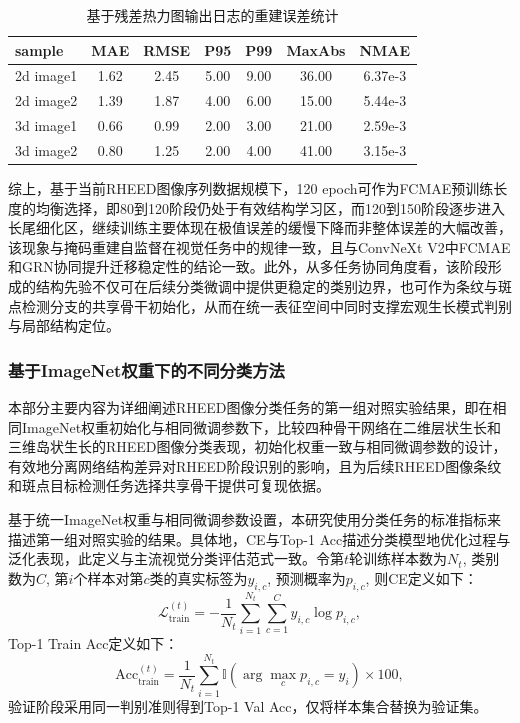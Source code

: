 \begin{table}[H]
    \centering
    \caption{基于残差热力图输出日志的重建误差统计}
    \label{tab:cp2_fcmae_residual_metrics}
    \small
    \begin{tabular}{lcccccc}
        \toprule
        sample    & MAE  & RMSE & P95  & P99  & MaxAbs & NMAE    \\
        \midrule
        2d image1 & 1.62 & 2.45 & 5.00 & 9.00 & 36.00  & 6.37e-3 \\
        2d image2 & 1.39 & 1.87 & 4.00 & 6.00 & 15.00  & 5.44e-3 \\
        3d image1 & 0.66 & 0.99 & 2.00 & 3.00 & 21.00  & 2.59e-3 \\
        3d image2 & 0.80 & 1.25 & 2.00 & 4.00 & 41.00  & 3.15e-3 \\
        \bottomrule
    \end{tabular}
\end{table}


综上，基于当前RHEED图像序列数据规模下，120 epoch可作为FCMAE预训练长度的均衡选择，即80到120阶段仍处于有效结构学习区，而120到150阶段逐步进入长尾细化区，继续训练主要体现在极值误差的缓慢下降而非整体误差的大幅改善，该现象与掩码重建自监督在视觉任务中的规律一致，且与ConvNeXt V2中FCMAE和GRN协同提升迁移稳定性的结论一致。此外，从多任务协同角度看，该阶段形成的结构先验不仅可在后续分类微调中提供更稳定的类别边界，也可作为条纹与斑点检测分支的共享骨干初始化，从而在统一表征空间中同时支撑宏观生长模式判别与局部结构定位。


\subsubsection{基于ImageNet权重下的不同分类方法}
本部分主要内容为详细阐述RHEED图像分类任务的第一组对照实验结果，即在相同ImageNet权重初始化与相同微调参数下，比较四种骨干网络在二维层状生长和三维岛状生长的RHEED图像分类表现，初始化权重一致与相同微调参数的设计，有效地分离网络结构差异对RHEED阶段识别的影响，且为后续RHEED图像条纹和斑点目标检测任务选择共享骨干提供可复现依据。

基于统一ImageNet权重与相同微调参数设置，本研究使用分类任务的标准指标来描述第一组对照实验的结果。具体地，CE与Top-1 Acc描述分类模型地优化过程与泛化表现，此定义与主流视觉分类评估范式一致。令第\(t\)轮训练样本数为\(N_t\), 类别数为\(C\), 第\(i\)个样本对第\(c\)类的真实标签为\(y_{i,c}\), 预测概率为\(p_{i,c}\), 则CE定义如下：
\begin{equation}
    \mathcal{L}_{\mathrm{train}}^{(t)}=-\frac{1}{N_t}\sum_{i=1}^{N_t}\sum_{c=1}^{C}y_{i,c}\log p_{i,c},
\end{equation}
Top-1 Train Acc定义如下：
\begin{equation}
    \mathrm{Acc}_{\mathrm{train}}^{(t)}=\frac{1}{N_t}\sum_{i=1}^{N_t}\mathbb{I}\!\left(\arg\max_{c}p_{i,c}=y_i\right)\times 100,
\end{equation}
验证阶段采用同一判别准则得到Top-1 Val Acc，仅将样本集合替换为验证集。

